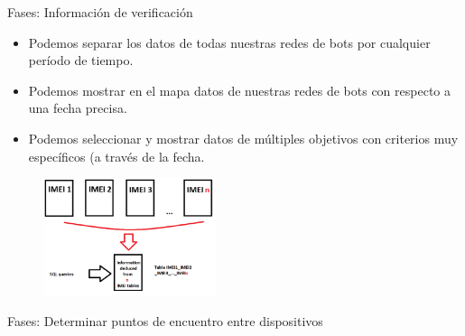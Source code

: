 \documentclass[aspectratio=43]{beamer}
\begin{document}
\begin{frame}{Fases: Información de verificación}

\begin{itemize}
\item Podemos separar los datos de todas nuestras redes de bots por cualquier período de tiempo.

\item Podemos mostrar en el mapa datos de nuestras redes de bots con respecto a una fecha precisa.

\item Podemos seleccionar y mostrar datos de múltiples objetivos con criterios muy específicos (a través de la fecha.
\end{itemize}
  	\begin{figure}[htbp] 

   \includegraphics[width=0.45\textwidth]{figuras/IMEIsConcatenados}  
  \label{IMEIsConcatenados}

\end{figure}

\end{frame}

\begin{frame}{Fases: Determinar puntos de encuentro entre dispositivos}
  
\end{frame}



\maketitle
\end{document}
